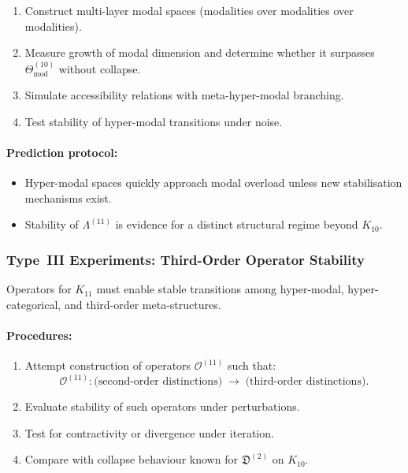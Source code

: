 \begin{enumerate}
    \item Construct multi-layer modal spaces
          (modalities over modalities over modalities).
    \item Measure growth of modal dimension and
          determine whether it surpasses
          $\Theta_{\mathrm{mod}}^{(10)}$ without collapse.
    \item Simulate accessibility relations with
          meta-hyper-modal branching.
    \item Test stability of hyper-modal transitions under noise.
\end{enumerate}

\paragraph{Prediction protocol:}

\begin{itemize}
    \item Hyper-modal spaces quickly approach modal overload unless
          new stabilisation mechanisms exist.
    \item Stability of $\Lambda^{(11)}$ is evidence for a
          distinct structural regime beyond $K_{10}$.
\end{itemize}



\subsubsection{Type~III Experiments: Third-Order Operator Stability}

Operators for $K_{11}$ must enable stable transitions among
hyper-modal, hyper-categorical, and third-order meta-structures.

\paragraph{Procedures:}

\begin{enumerate}
    \item Attempt construction of operators $\mathcal{O}^{(11)}$
          such that:
          \[
              \mathcal{O}^{(11)} :
              \text{(second-order distinctions)}
                 \;\longrightarrow\;
              \text{(third-order distinctions)}.
          \]
    \item Evaluate stability of such operators under perturbations.
    \item Test for contractivity or divergence under iteration.
    \item Compare with collapse behaviour known for
          $\mathfrak{D}^{(2)}$ on $K_{10}$.
\end{enumerate}

